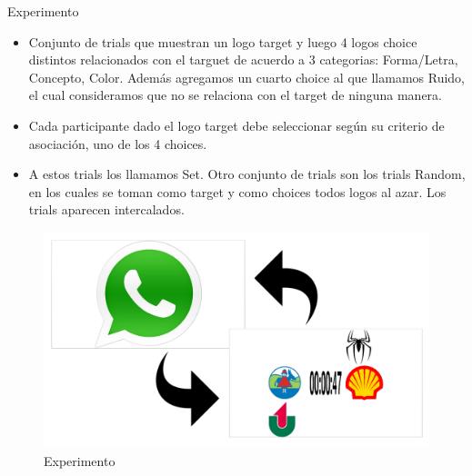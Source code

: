 \documentclass{beamer}
\begin{document}
\begin{frame}{Experimento}
  \begin{itemize}
  \item {
    Conjunto de trials que muestran un logo target y luego 4 logos choice distintos relacionados con el targuet de acuerdo a 3 categorias: Forma/Letra, Concepto, Color. Además agregamos un cuarto choice al que llamamos Ruido, el cual consideramos que no se relaciona con el target de ninguna manera.
    \pause %
  }
  \item {
	Cada participante dado el logo target debe seleccionar según su criterio de asociación, uno de los 4 choices.
  }
    \pause %
  \item {
	A estos trials los llamamos Set. Otro conjunto de trials son los trials Random, en los cuales se toman como target y como choices todos logos al azar. Los trials aparecen intercalados.
  }
  \end{itemize}
\end{frame}

\begin{frame}
\begin{figure}[h]
 \centering
  \begin{minipage}[c]{1\textwidth}
	\centering	
	\includegraphics[scale=0.16]{exp.png}
        \caption{Experimento}
  \end{minipage}
\end{figure}
\end{frame}
\end{document}
